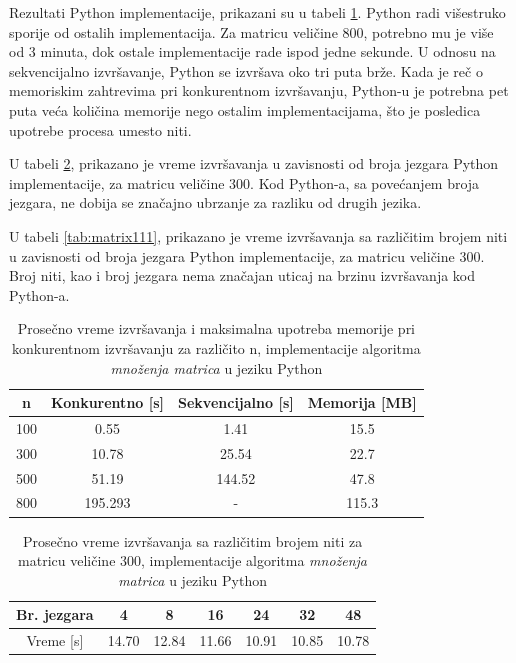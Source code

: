\documentclass[12pt,oneside]{memoir}
\begin{document}
Rezultati Python implementacije, prikazani su u tabeli \ref{tab:matrix1}. Python radi višestruko sporije od ostalih implementacija. Za matricu veličine 800, potrebno mu je više od 3 minuta, dok ostale implementacije rade ispod jedne sekunde. U odnosu na sekvencijalno izvršavanje, Python se izvršava oko tri puta brže. Kada je reč o memoriskim zahtrevima pri konkurentnom izvršavanju, Python-u je potrebna pet puta veća količina memorije nego ostalim implementacijama, što je posledica upotrebe procesa umesto niti.

U  tabeli \ref{tab:matrix11}, prikazano je vreme izvršavanja u zavisnosti od broja jezgara Python implementacije, za matricu veličine 300. Kod Python-a, sa povećanjem broja jezgara, ne dobija se značajno ubrzanje za razliku od drugih jezika. 

U  tabeli \ref{tab:matrix111}, prikazano je vreme izvršavanja sa različitim brojem niti u zavisnosti od broja jezgara Python implementacije, za matricu veličine 300. Broj niti, kao i broj jezgara  nema značajan uticaj na brzinu izvršavanja kod Python-a.

\begin{table}
\begin{center}
\caption{Prosečno vreme izvršavanja i maksimalna upotreba memorije pri konkurentnom izvršavanju za različito n,  implementacije  algoritma \textit{množenja matrica}  u jeziku Python}
\begin{tabular}{||c||c|c|c||}
\hline
n & Konkurentno [s]& Sekvencijalno [s] & Memorija [MB] \\ \hline
100	&0.55		&1.41		&15.5\\
300	&10.78	&25.54	&22.7\\
500	&51.19	&144.52	&47.8\\
800	&195.293	&- 		&115.3\\
\hline
\end{tabular}
\label{tab:matrix1}
\end{center}
\end{table}

\begin{table}
\begin{center}
\caption{Prosečno vreme izvršavanja sa različitim brojem niti za matricu veličine 300, implementacije algoritma \textit{množenja matrica} u jeziku Python}
\begin{tabular}{||c||c|c|c|c|c|c||}
\hline
Br. jezgara &4  &8 &16 &24 & 32 &48 \\ \hline
Vreme [s]	&14.70	&12.84	&11.66 	& 10.91	&10.85	&10.78\\ \hline  
\end{tabular}
\label{tab:matrix11}
\end{center}
\end{table}
\end{document}
